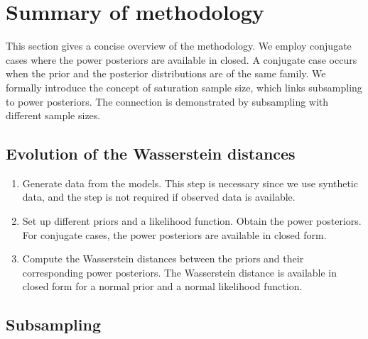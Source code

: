 \documentclass[12pt]{article}
\begin{document}
\section{Summary of methodology}
This section gives a concise overview of the methodology.  We employ conjugate cases where the power posteriors are available in closed. A conjugate case occurs when the prior and the posterior distributions are of the same family. We formally introduce the concept of saturation sample size, which links subsampling to power posteriors. The connection is demonstrated by subsampling with different sample sizes. 

\subsection{Evolution of the Wasserstein distances}
\begin{enumerate}
	\item Generate data from the models. This step is necessary since we use synthetic data, and the step is not required if observed data is available.
	\item Set up different priors and a likelihood function. Obtain the power posteriors. For conjugate cases, the power posteriors are available in closed form. 
	\item Compute the Wasserstein distances between the priors and their corresponding power posteriors. The Wasserstein distance is available in closed form for a normal prior and a normal likelihood function. 
\end{enumerate}

\subsection{Subsampling}
\end{document}
